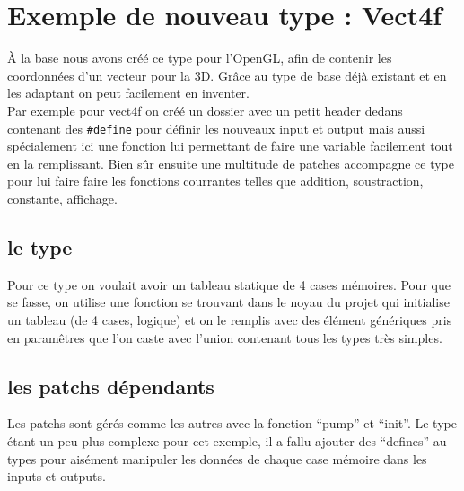 \section{Exemple de nouveau type : Vect4f}

\`A la base nous avons cr\'e\'e ce type pour l'OpenGL, afin de
contenir les coordonn\'ees d'un vecteur pour la 3D.
Gr\^ace au type de base d\'ej\`a existant et en les
adaptant on peut facilement en inventer.\\

Par exemple pour vect4f on cr\'e\'e un dossier avec un
petit header dedans contenant des {\tt \#define} pour
d\'efinir les nouveaux input et output mais aussi
sp\'ecialement ici une fonction lui permettant de faire
une variable facilement tout en la remplissant.
Bien s\^ur ensuite une multitude de patches accompagne
ce type pour lui faire faire les fonctions courrantes
telles que addition, soustraction, constante, affichage.\\

\subsection{le type}
Pour ce type on voulait avoir un tableau statique de 4 cases
m\'emoires. Pour que se fasse, on utilise une fonction se trouvant
dans le noyau du projet qui initialise un tableau (de 4 cases, logique)
et on le remplis avec des \'el\'ement g\'en\'eriques pris en
param\^etres que l'on caste avec l'union contenant tous les
types tr\`es simples. \\

\subsection{les patchs d\'ependants}
Les patchs sont g\'er\'es comme les autres avec la fonction
``pump'' et ``init''.
Le type \'etant un peu plus complexe pour cet exemple,
il a fallu ajouter des ``defines'' au types pour ais\'ement
manipuler les donn\'ees de chaque case m\'emoire
dans les inputs et outputs.\\
